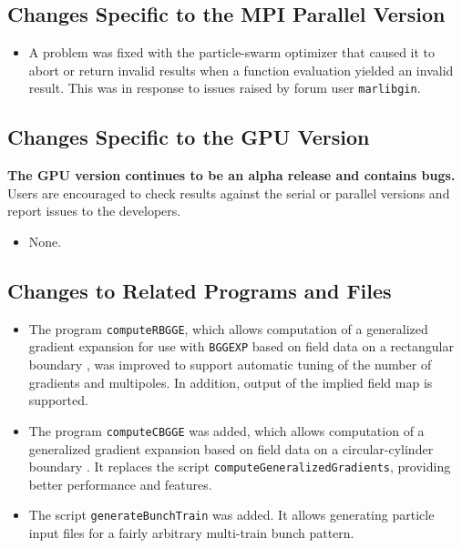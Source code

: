 \documentclass[11pt]{article}
\begin{document}
\subsection{Changes Specific to the MPI Parallel Version}

\begin{itemize}
\item A problem was fixed with the particle-swarm optimizer that caused it to abort or return invalid results when
  a function evaluation yielded an invalid result. This was in response to issues raised by forum user \verb|marlibgin|.
\end{itemize}

\subsection{Changes Specific to the GPU Version}

{\bf The GPU version continues to be an alpha release and contains bugs.}  Users are encouraged to check results against
the serial or parallel versions and report issues to the developers.

\begin{itemize}
\item None.
\end{itemize}

\subsection{Changes to Related Programs and Files}

\begin{itemize}
\item The program \verb|computeRBGGE|, which allows computation of a generalized gradient
  expansion\cite{Venturini-NIMA427-387} for use with \verb|BGGEXP| based on field data on a rectangular boundary
  \cite{Mitchell-2007}, was improved to support automatic tuning of the number of gradients and multipoles.
  In addition, output of the implied field map is supported.
\item The program \verb|computeCBGGE| was added, which allows computation of a generalized gradient expansion
  based on field data on a circular-cylinder boundary \cite{Venturini-NIMA427-387}. It replaces the script
  \verb|computeGeneralizedGradients|, providing better performance and features.
\item The script \verb|generateBunchTrain| was added. It allows generating particle input files for a fairly
  arbitrary multi-train bunch pattern.
\end{itemize}
\end{document}
